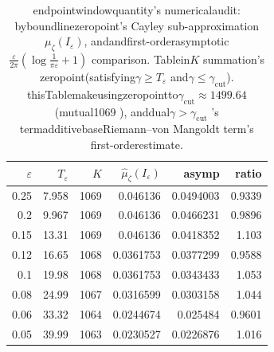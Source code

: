 \begin{table}[H]
\centering
\small
\begin{tabular}{rrrrrr}
\toprule
$\varepsilon$ & $T_{\varepsilon}$ & $K$ & $\widehat\mu_{\zeta}(I_{\varepsilon})$ & asymp & ratio\\
\midrule
0.25 & 7.958 & 1069 & 0.046136 & 0.0494003 & 0.9339\\
0.2 & 9.967 & 1069 & 0.046136 & 0.0466231 & 0.9896\\
0.15 & 13.31 & 1069 & 0.046136 & 0.0418352 & 1.103\\
0.12 & 16.65 & 1068 & 0.0361753 & 0.0377299 & 0.9588\\
0.1 & 19.98 & 1068 & 0.0361753 & 0.0343433 & 1.053\\
0.08 & 24.99 & 1067 & 0.0316599 & 0.0303158 & 1.044\\
0.06 & 33.32 & 1064 & 0.0244674 & 0.025484 & 0.9601\\
0.05 & 39.99 & 1063 & 0.0230527 & 0.0226876 & 1.016\\
\bottomrule
\end{tabular}
\caption{endpointwindowquantity's numericalaudit: byboundlinezeropoint's  Cayley sub-approximation$\mu_{\zeta}(I_{\varepsilon})$, andandfirst-orderasymptotic$\frac{\varepsilon}{2\pi}(\log\frac{1}{\pi\varepsilon}+1)$ comparison. Tablein$K$ summation's zeropoint(satisfying$\gamma\ge T_{\varepsilon}$ and$\gamma\le \gamma_{\mathrm{cut}}$). thisTablemakeusingzeropointto$\gamma_{\mathrm{cut}}\approx 1499.64$(mutual1069 ), anddual$\gamma>\gamma_{\mathrm{cut}}$ 's termadditivebaseRiemann--von Mangoldt term's first-orderestimate.}
\label{tab:horizon-mu-endpoint-window-asymptotic}
\end{table}
